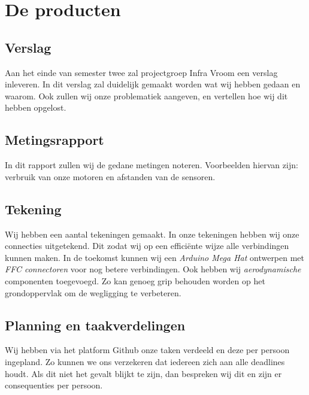 \section{De producten}
\subsection{Verslag}
Aan het einde van semester twee zal projectgroep Infra Vroom een verslag inleveren. In dit verslag zal duidelijk gemaakt worden wat wij hebben gedaan en waarom. Ook zullen wij onze problematiek aangeven, en vertellen hoe wij dit hebben opgelost.
\subsection{Metingsrapport}
In dit rapport zullen wij de gedane metingen noteren. Voorbeelden hiervan zijn: verbruik van onze motoren en afstanden van de sensoren.
\subsection{Tekening}
Wij hebben een aantal tekeningen gemaakt. In onze tekeningen hebben wij onze connecties uitgetekend. Dit zodat wij op een efficiënte wijze alle verbindingen kunnen maken. In de toekomst kunnen wij een \textit{Arduino Mega Hat}  ontwerpen met \textit{FFC connectoren} voor nog betere verbindingen.
Ook hebben wij \textit{aerodynamische} componenten toegevoegd. Zo kan genoeg grip behouden worden op het grondoppervlak om de wegligging te verbeteren.
\subsection{Planning en taakverdelingen}
Wij hebben via het platform Github onze taken verdeeld en deze per persoon ingepland. Zo kunnen we ons verzekeren dat iedereen zich aan alle deadlines houdt. Als dit niet het gevalt blijkt te zijn, dan bespreken wij dit en zijn er consequenties per persoon.
